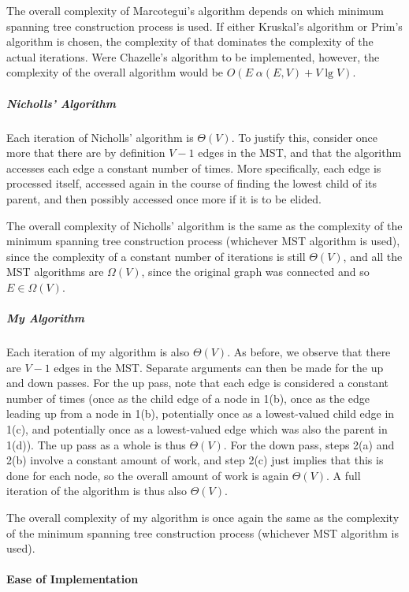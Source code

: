 The overall complexity of Marcotegui's algorithm depends on which minimum spanning tree construction process is used. If either Kruskal's algorithm or Prim's algorithm is chosen, the complexity of that dominates the complexity of the actual iterations. Were Chazelle's algorithm to be implemented, however, the complexity of the overall algorithm would be $O(E \; \alpha(E,V) + V \lg V)$.

\subparagraph{Nicholls' Algorithm}

Each iteration of Nicholls' algorithm is $\Theta(V)$. To justify this, consider once more that there are by definition $V - 1$ edges in the MST, and that the algorithm accesses each edge a constant number of times. More specifically, each edge is processed itself, accessed again in the course of finding the lowest child of its parent, and then possibly accessed once more if it is to be elided.

The overall complexity of Nicholls' algorithm is the same as the complexity of the minimum spanning tree construction process (whichever MST algorithm is used), since the complexity of a constant number of iterations is still $\Theta(V)$, and all the MST algorithms are $\Omega(V)$, since the original graph was connected and so $E \in \Omega(V)$.

\subparagraph{My Algorithm}

Each iteration of my algorithm is also $\Theta(V)$. As before, we observe that there are $V - 1$ edges in the MST. Separate arguments can then be made for the up and down passes. For the up pass, note that each edge is considered a constant number of times (once as the child edge of a node in 1(b), once as the edge leading up from a node in 1(b), potentially once as a lowest-valued child edge in 1(c), and potentially once as a lowest-valued edge which was also the parent in 1(d)). The up pass as a whole is thus $\Theta(V)$. For the down pass, steps 2(a) and 2(b) involve a constant amount of work, and step 2(c) just implies that this is done for each node, so the overall amount of work is again $\Theta(V)$. A full iteration of the algorithm is thus also $\Theta(V)$.

The overall complexity of my algorithm is once again the same as the complexity of the minimum spanning tree construction process (whichever MST algorithm is used).

\paragraph{Ease of Implementation}

